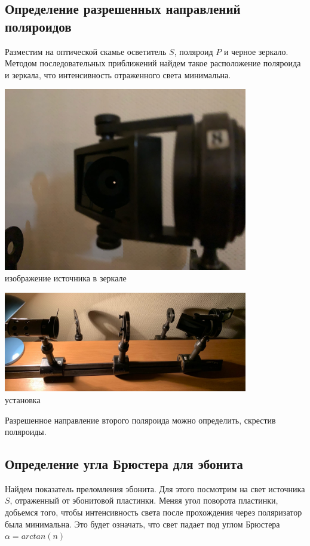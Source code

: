 \subsection*{Определение разрешенных направлений поляроидов}
Разместим на оптической скамье осветитель $S$, поляроид $P$ и черное зеркало. Методом последовательных приближений найдем такое расположение поляроида и зеркала, что интенсивность отраженного света минимальна.

\begin{center}
\includegraphics[width=0.80\textwidth]{1.png}\\
изображение источника в зеркале
\end{center}

\begin{center}
\includegraphics[width=0.80\textwidth]{2.png}\\
установка
\end{center}

Разрешенное направление второго поляроида можно определить, скрестив поляроиды.

\subsection*{Определение угла Брюстера для эбонита}
Найдем показатель преломления эбонита. Для этого посмотрим на свет источника $S$, отраженный от эбонитовой пластинки. Меняя угол поворота пластинки, добьемся того, чтобы интенсивность света после прохождения через поляризатор была минимальна. Это будет означать, что свет падает под углом Брюстера $\alpha = arctan(n)$

